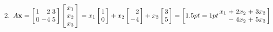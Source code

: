 \begin{multicols}{2}
\begin{ex}
\begin{enumerate}[label={\alph*.}]
\end{enumerate}
\begin{sol}
\begin{enumerate}[label={\alph*.}]
\setcounter{enumi}{1}
\item
$
A\vect{x} = \leftB \begin{array}{rrr}
1 & 2 & 3 \\
0 & -4 & 5
\end{array} \rightB \leftB \begin{array}{r}
x_{1} \\
x_{2} \\
x_{3}
\end{array} \rightB  = 
x_{1} \leftB \begin{array}{r}
1 \\
0
\end{array} \rightB + 
x_{2} \leftB \begin{array}{r}
2 \\
-4
\end{array} \rightB +
x_{3} \leftB \begin{array}{r}
3 \\
5
\end{array} \rightB  = \leftB \arraycolsep=1pt \begin{array}{rrrrr}
x_{1} & + & 2x_{2} & + & 3x_{3} \\
& - & 4x_{2} & + & 5x_{3}
\end{array} \rightB
$



\end{enumerate}
\end{sol}
\end{ex}
\end{multicols}
